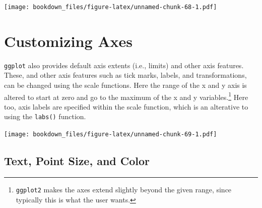\documentclass[]{krantz}
\makeatletter
\newenvironment{Shaded}{\begin{snugshade}}{\end{snugshade}}
\newcommand{\KeywordTok}[1]{\textcolor[rgb]{0.27,0.27,0.27}{\textbf{#1}}}
\newcommand{\DataTypeTok}[1]{\textcolor[rgb]{0.27,0.27,0.27}{#1}}
\newcommand{\DecValTok}[1]{\textcolor[rgb]{0.06,0.06,0.06}{#1}}
\newcommand{\StringTok}[1]{\textcolor[rgb]{0.5,0.5,0.5}{#1}}
\newcommand{\OperatorTok}[1]{\textcolor[rgb]{0.43,0.43,0.43}{\textbf{#1}}}
\newcommand{\NormalTok}[1]{#1}
\newenvironment{kframe}{%
\medskip{}
\setlength{\fboxsep}{.8em}
 \def\at@end@of@kframe{}%
 \ifinner\ifhmode%
  \def\at@end@of@kframe{\end{minipage}}%
  \begin{minipage}{\columnwidth}%
 \fi\fi%
 \def\FrameCommand##1{\hskip\@totalleftmargin \hskip-\fboxsep
 \colorbox{shadecolor}{##1}\hskip-\fboxsep
     \hskip-\linewidth \hskip-\@totalleftmargin \hskip\columnwidth}%
 \MakeFramed {\advance\hsize-\width
   \@totalleftmargin\z@ \linewidth\hsize
   \@setminipage}}%
 {\par\unskip\endMakeFramed%
 \at@end@of@kframe}
\renewenvironment{Shaded}{\begin{kframe}}{\end{kframe}}
\makeatother
\begin{document}
\texttt{[image: bookdown\_files/figure-latex/unnamed-chunk-68-1.pdf]}

\section{Customizing Axes}\label{customizing-axes}

\texttt{ggplot} also provides default axis extents (i.e., limits) and
other axis features. These, and other axis features such as tick marks,
labels, and transformations, can be changed using the scale functions.
Here the range of the x and y axis is altered to start at zero and go to
the maximum of the x and y variables.\footnote{\texttt{ggplot2} makes
  the axes extend slightly beyond the given range, since typically this
  is what the user wants.} Here too, axis labels are specified within
the scale function, which is an alterative to using the \texttt{labs()}
function.

\begin{Shaded}
\end{Shaded}

\texttt{[image: bookdown\_files/figure-latex/unnamed-chunk-69-1.pdf]}

\subsection{Text, Point Size, and
Color}\label{text-point-size-and-color}
\end{document}
